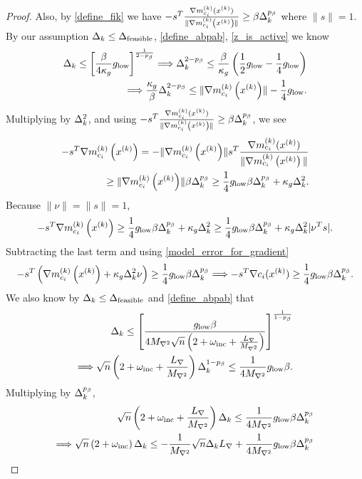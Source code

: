 \begin{proof}
Also, by \cref{define_fik} we have $-s^T {\frac{\nabla m^{(k)}_{c_i}(x^{(k)})}{\|\nabla m^{(k)}_{c_i}\left(x^{(k)}\right)\|}} \ge \beta \Delta_k^{p_{\beta}}$ where $\|s\| = 1$.
By our assumption $\Delta_k \le {\Delta_{\textrm{feasible}}}$, \cref{define_abpab}, \cref{z_is_active} we know
\begin{align*}
\Delta_k \le \left[\frac{\beta}{4\kappa_g}{ g_{\textrm{low}} } \right]^{\frac 1 {2 - p_{\beta}}}
\Longrightarrow \Delta_k^{2 - p_{\beta}} \le \frac{\beta}{\kappa_g}\left(\frac 1 2{ g_{\textrm{low}} }  - \frac 1 4 { g_{\textrm{low}} } \right) \\
\Longrightarrow \frac{\kappa_g}{\beta} \Delta_k^{2 - p_{\beta}} \le \|{\nabla m_{c_i}^{(k)}\left(x^{(k)}\right)}\| - \frac 1 4 { g_{\textrm{low}} }.
\end{align*}
Multiplying by $\Delta_k^2$, and using $-s^T {\frac{\nabla m^{(k)}_{c_i}(x^{(k)})}{\|\nabla m^{(k)}_{c_i}\left(x^{(k)}\right)\|}} \ge \beta \Delta_k^{p_{\beta}}$, we see
\begin{align*}
-s^T{\nabla m_{c_i}^{(k)}\left(x^{(k)}\right)} =  -\|{\nabla m_{c_i}^{(k)}\left(x^{(k)}\right)}\|s^T{\frac{\nabla m^{(k)}_{c_i}(x^{(k)})}{\|\nabla m^{(k)}_{c_i}\left(x^{(k)}\right)\|}} \\
\ge \|{\nabla m_{c_i}^{(k)}\left(x^{(k)}\right)}\|\beta\Delta_k^{p_{\beta}} 
\ge \frac 1 4 { g_{\textrm{low}} }  \beta \Delta_k^{p_{\beta}} + \kappa_g\Delta_k^2.
\end{align*}
Because $\|\nu\| = \|s\| = 1$,
\begin{align*}
-s^T{\nabla m_{c_i}^{(k)}\left(x^{(k)}\right)} \ge \frac 1 4 { g_{\textrm{low}} }  \beta \Delta_k^{p_{\beta}} + \kappa_g\Delta_k^2 \ge \frac 1 4 { g_{\textrm{low}} }  \beta \Delta_k^{p_{\beta}} + \kappa_g\Delta_k^2|\nu^T s|.
\end{align*}
Subtracting the last term and using \cref{model_error_for_gradient}
\begin{align}
-s^T\left({\nabla m_{c_i}^{(k)}\left(x^{(k)}\right)} + \kappa_g\Delta_k^2\nu\right) \ge \frac 1 4 { g_{\textrm{low}} }  \beta \Delta_k ^{p_{\beta}}
\Longrightarrow -s^T\nabla c_i(x^{(k)}) \ge \frac 1 4 { g_{\textrm{low}} }  \beta \Delta_k^{p_{\beta}}. \label{nsc_pos}
\end{align}
We also know by $\Delta_k \le {\Delta_{\textrm{feasible}}}$ and \cref{define_abpab} that
\begin{align*}
\Delta_k \le \left[\frac {{ g_{\textrm{low}} }  \beta} {4{M_{\nabla^2}}\sqrt{n}\left(2 + \omega_{\text{inc}} + \frac {{L_{\nabla}}} {{M_{\nabla^2}}} \right)}\right]^{\frac1 {1 - p_{\beta}} } \\
\Longrightarrow \sqrt{n}\left(2 + \omega_{\text{inc}} + \frac {{L_{\nabla}}} {{M_{\nabla^2}}} \right) \Delta_k^{1-p_{\beta}}\le \frac 1 {4{M_{\nabla^2}}} { g_{\textrm{low}} }  \beta.
\end{align*}
Multiplying by $\Delta_k^{p_{\beta}}$,
\begin{align*}
\sqrt{n}\left(2 + \omega_{\text{inc}} + \frac {{L_{\nabla}}} {{M_{\nabla^2}}} \right) \Delta_k \le \frac 1 {4{M_{\nabla^2}}} { g_{\textrm{low}} }  \beta \Delta_k^{p_{\beta}} \\
\Longrightarrow \sqrt{n}\left(2 + \omega_{\text{inc}} \right) \Delta_k \le -\frac 1 {{M_{\nabla^2}}} \sqrt{n}\Delta_k {L_{\nabla}} + \frac 1 {4{M_{\nabla^2}}} { g_{\textrm{low}} }  \beta \Delta_k^{p_{\beta}}
\end{align*}

\end{proof}
